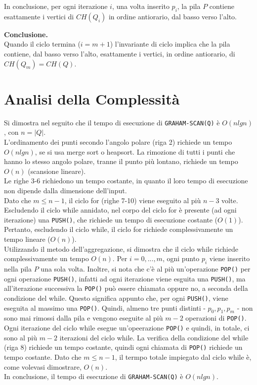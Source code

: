 \documentclass[12pt,a4paper]{report}
\begin{document}
\noindent In conclusione, per ogni iterazione $i$, una volta inserito $p_i$, la pila $P$ contiene esattamente i vertici di $CH(Q_i)$ in ordine antiorario, dal basso verso l'alto.

\vspace{0.5cm}

\noindent \textbf{Conclusione.}\\
Quando il ciclo termina ($i = m + 1$) l'invariante di ciclo implica che la pila contiene, dal basso verso l'alto, esattamente i vertici, in ordine antiorario, di $CH(Q_m) = CH(Q)$. 

\section{Analisi della Complessità}\label{ch:complessita}
\noindent Si dimostra nel seguito che il tempo di esecuzione di \texttt{GRAHAM-SCAN(Q)} è $O(nlgn)$, con $n = |Q|$.\\
L'ordinamento dei punti secondo l'angolo polare (riga 2) richiede un tempo $O(nlgn)$, se si usa merge sort o heapsort. La rimozione di tutti i punti che hanno lo stesso angolo polare, tranne il punto più lontano, richiede un tempo $O(n)$ (scansione lineare).\\
Le righe 3-6 richiedono un tempo costante, in quanto il loro tempo di esecuzione non dipende dalla dimensione dell'input.\\
Dato che $m \leq n - 1$, il ciclo for (righe 7-10) viene eseguito al più $n - 3$ volte. Escludendo il ciclo while annidato, nel corpo del ciclo for è presente (ad ogni iterazione) una \texttt{PUSH()}, che richiede un tempo di esecuzione costante ($O(1)$). Pertanto, escludendo il ciclo while, il ciclo for richiede complessivamente un tempo lineare ($O(n)$).\\
Utilizzando il metodo dell'aggregazione, si dimostra che il ciclo while richiede complessivamente un tempo $O(n)$. Per $i = 0, ..., m$, ogni punto $p_i$ viene inserito nella pila $P$ una sola volta. Inoltre, si nota che c'è al più un'operazione \texttt{POP()} per ogni operazione \texttt{PUSH()}, infatti ad ogni iterazione viene esguita una \texttt{PUSH()}, ma all'iterazione successiva la \texttt{POP()} può essere chiamata oppure no, a seconda della condizione del while. Questo significa appunto che, per ogni \texttt{PUSH()}, viene eseguita al massimo una \texttt{POP()}. Quindi, almeno tre punti distinti - $p_0, p_1, p_m$ - non sono mai rimossi dalla pila e vengono eseguite al più $m - 2$ operazioni di \texttt{POP()}. Ogni iterazione del ciclo while esegue un'opeerazione \texttt{POP()} e quindi, in totale, ci sono al più $m - 2$ iterazioni del ciclo while. La verifica della condizione del while (riga 8) richiede un tempo costante, quindi ogni chiamata di \texttt{POP()} richiede un tempo costante. Dato che $m \leq n - 1$, il termpo totale impiegato dal ciclo while è, come volevasi dimostrare, $O(n)$.\\
In conclusione, il tempo di esecuzione di \texttt{GRAHAM-SCAN(Q)} è $O(nlgn)$.
\end{document}
